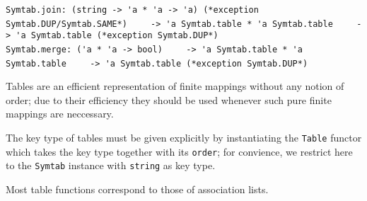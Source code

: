 \begin{isabellebody}
\begin{isamarkuptext}
\begin{mldecls}
  \verb|Symtab.join: (string -> 'a * 'a -> 'a) (*exception Symtab.DUP/Symtab.SAME*)|\isasep\isanewline%
\verb|    -> 'a Symtab.table * 'a Symtab.table|\isasep\isanewline%
\verb|    -> 'a Symtab.table (*exception Symtab.DUP*)| \\
  \verb|Symtab.merge: ('a * 'a -> bool)|\isasep\isanewline%
\verb|    -> 'a Symtab.table * 'a Symtab.table|\isasep\isanewline%
\verb|    -> 'a Symtab.table (*exception Symtab.DUP*)|
  \end{mldecls}%
\end{isamarkuptext}%
\isamarkuptrue%
%
\begin{isamarkuptext}%
Tables are an efficient representation of finite mappings without
  any notion of order;  due to their efficiency they should be used
  whenever such pure finite mappings are neccessary.

  The key type of tables must be given explicitly by instantiating
  the \verb|Table| functor which takes the key type
  together with its \verb|order|; for convience, we restrict
  here to the \verb|Symtab| instance with \verb|string|
  as key type.

  Most table functions correspond to those of association lists.%
\end{isamarkuptext}%
\isamarkuptrue%
%
\isadelimtheory
%
\endisadelimtheory
%
\isatagtheory
{}\isamarkupfalse%
%
\endisatagtheory
{\isafoldtheory}%
%
\isadelimtheory
%
\endisadelimtheory
\end{isabellebody}%

